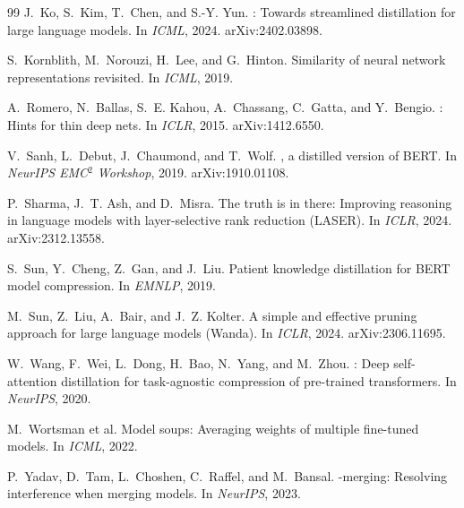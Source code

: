 \documentclass[11pt]{article}
\begin{document}
\begin{thebibliography}{99}
J.~Ko, S.~Kim, T.~Chen, and S.-Y. Yun.
: Towards streamlined distillation for large language
  models.
\newblock In \emph{ICML}, 2024. arXiv:2402.03898.

S.~Kornblith, M.~Norouzi, H.~Lee, and G.~Hinton.
\newblock Similarity of neural network representations revisited.
\newblock In \emph{ICML}, 2019.

A.~Romero, N.~Ballas, S.~E. Kahou, A.~Chassang, C.~Gatta, and Y.~Bengio.
: Hints for thin deep nets.
\newblock In \emph{ICLR}, 2015. arXiv:1412.6550.

V.~Sanh, L.~Debut, J.~Chaumond, and T.~Wolf.
, a distilled version of {BERT}.
\newblock In \emph{NeurIPS EMC$^2$ Workshop}, 2019. arXiv:1910.01108.

P.~Sharma, J.~T. Ash, and D.~Misra.
\newblock The truth is in there: Improving reasoning in language models with
  layer-selective rank reduction ({LASER}).
\newblock In \emph{ICLR}, 2024. arXiv:2312.13558.

S.~Sun, Y.~Cheng, Z.~Gan, and J.~Liu.
\newblock Patient knowledge distillation for {BERT} model compression.
\newblock In \emph{EMNLP}, 2019.

M.~Sun, Z.~Liu, A.~Bair, and J.~Z. Kolter.
\newblock A simple and effective pruning approach for large language models
  ({Wanda}).
\newblock In \emph{ICLR}, 2024. arXiv:2306.11695.

W.~Wang, F.~Wei, L.~Dong, H.~Bao, N.~Yang, and M.~Zhou.
: Deep self-attention distillation for task-agnostic
  compression of pre-trained transformers.
\newblock In \emph{NeurIPS}, 2020.

M.~Wortsman et al.
\newblock Model soups: Averaging weights of multiple fine-tuned models.
\newblock In \emph{ICML}, 2022.

P.~Yadav, D.~Tam, L.~Choshen, C.~Raffel, and M.~Bansal.
-merging: Resolving interference when merging models.
\newblock In \emph{NeurIPS}, 2023.

\end{thebibliography}
\endgroup
\end{document}
